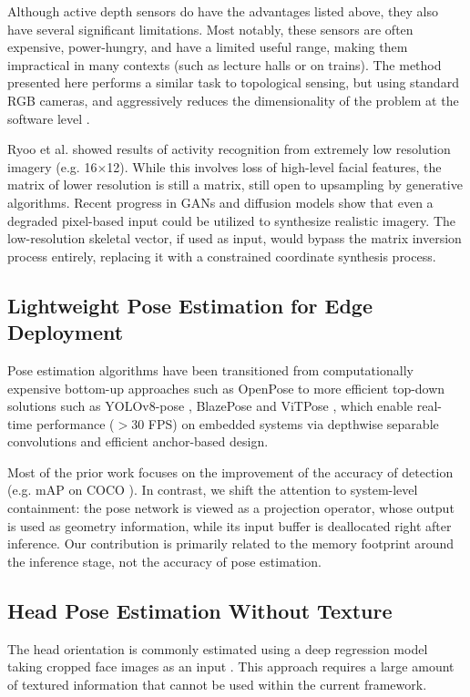\documentclass[conference]{IEEEtran}
\begin{document}
Although active depth sensors do have the advantages listed above, they also have several significant limitations. Most notably, these sensors are often expensive, power-hungry, and have a limited useful range, making them impractical in many contexts (such as lecture halls or on trains). The method presented here performs a similar task to topological sensing, but using standard RGB cameras, and aggressively reduces the dimensionality of the problem at the software level \cite{b23}.

Ryoo et al. \cite{b2} showed results of activity recognition from extremely low resolution imagery (e.g. 16$\times$12). While this involves loss of high-level facial features, the matrix of lower resolution is still a matrix, still open to upsampling by generative algorithms. Recent progress in GANs and diffusion models show that even a degraded pixel-based input could be utilized to synthesize realistic imagery. The low-resolution skeletal vector, if used as input, would bypass the matrix inversion process entirely, replacing it with a constrained coordinate synthesis process.

\subsection{Lightweight Pose Estimation for Edge Deployment}
Pose estimation algorithms have been transitioned from computationally expensive bottom-up approaches such as OpenPose \cite{b6} to more efficient top-down solutions such as YOLOv8-pose \cite{b10}, BlazePose \cite{b8} and ViTPose \cite{b9}, which enable real-time performance ($>$30 FPS) on embedded systems via depthwise separable convolutions and efficient anchor-based design.

Most of the prior work focuses on the improvement of the accuracy of detection (e.g. mAP on COCO \cite{b11}). In contrast, we shift the attention to system-level containment: the pose network is viewed as a projection operator, whose output is used as geometry information, while its input buffer is deallocated right after inference. Our contribution is primarily related to the memory footprint around the inference stage, not the accuracy of pose estimation.

\subsection{Head Pose Estimation Without Texture}
The head orientation is commonly estimated using a deep regression model taking cropped face images as an input \cite{b14}. This approach requires a large amount of textured information that cannot be used within the current framework.
\end{document}

